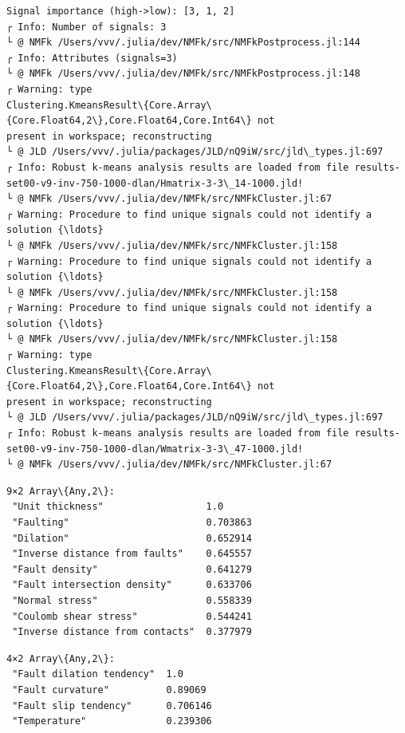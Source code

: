 \documentclass[11pt]{article}
\begin{document}
    \begin{Verbatim}[commandchars=\\\{\}]
Signal importance (high->low): [3, 1, 2]
┌ Info: Number of signals: 3
└ @ NMFk /Users/vvv/.julia/dev/NMFk/src/NMFkPostprocess.jl:144
┌ Info: Attributes (signals=3)
└ @ NMFk /Users/vvv/.julia/dev/NMFk/src/NMFkPostprocess.jl:148
┌ Warning: type
Clustering.KmeansResult\{Core.Array\{Core.Float64,2\},Core.Float64,Core.Int64\} not
present in workspace; reconstructing
└ @ JLD /Users/vvv/.julia/packages/JLD/nQ9iW/src/jld\_types.jl:697
┌ Info: Robust k-means analysis results are loaded from file results-
set00-v9-inv-750-1000-dlan/Hmatrix-3-3\_14-1000.jld!
└ @ NMFk /Users/vvv/.julia/dev/NMFk/src/NMFkCluster.jl:67
┌ Warning: Procedure to find unique signals could not identify a solution {\ldots}
└ @ NMFk /Users/vvv/.julia/dev/NMFk/src/NMFkCluster.jl:158
┌ Warning: Procedure to find unique signals could not identify a solution {\ldots}
└ @ NMFk /Users/vvv/.julia/dev/NMFk/src/NMFkCluster.jl:158
┌ Warning: Procedure to find unique signals could not identify a solution {\ldots}
└ @ NMFk /Users/vvv/.julia/dev/NMFk/src/NMFkCluster.jl:158
┌ Warning: type
Clustering.KmeansResult\{Core.Array\{Core.Float64,2\},Core.Float64,Core.Int64\} not
present in workspace; reconstructing
└ @ JLD /Users/vvv/.julia/packages/JLD/nQ9iW/src/jld\_types.jl:697
┌ Info: Robust k-means analysis results are loaded from file results-
set00-v9-inv-750-1000-dlan/Wmatrix-3-3\_47-1000.jld!
└ @ NMFk /Users/vvv/.julia/dev/NMFk/src/NMFkCluster.jl:67
    \end{Verbatim}

    
    \begin{Verbatim}[commandchars=\\\{\}]
9×2 Array\{Any,2\}:
 "Unit thickness"                  1.0
 "Faulting"                        0.703863
 "Dilation"                        0.652914
 "Inverse distance from faults"    0.645557
 "Fault density"                   0.641279
 "Fault intersection density"      0.633706
 "Normal stress"                   0.558339
 "Coulomb shear stress"            0.544241
 "Inverse distance from contacts"  0.377979
    \end{Verbatim}

    
    
    \begin{Verbatim}[commandchars=\\\{\}]
4×2 Array\{Any,2\}:
 "Fault dilation tendency"  1.0
 "Fault curvature"          0.89069
 "Fault slip tendency"      0.706146
 "Temperature"              0.239306
    \end{Verbatim}
\end{document}
